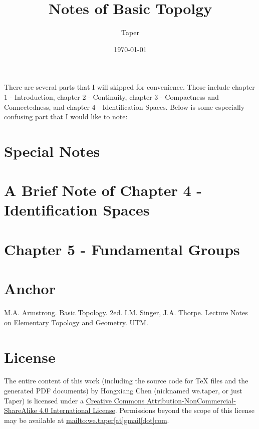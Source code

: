 \documentclass{article}
\title{Notes of Basic Topolgy}
\date{\today}
\author{Taper}
\begin{document}
\maketitle
{}
\tableofcontents
There are several parts that I will skipped for convenience. Those
include chapter 1 - Introduction, chapter 2 - Continuity, chapter 3 -
Compactness and Connectedness, and chapter 4 - Identification Spaces.
Below is some especially confusing part that I would like to note:

\section{Special Notes}
\label{sec:Special-Notes}


\section{A Brief Note of Chapter 4 - Identification Spaces}
\label{sec:Brief-Note-Chapter-4}


\section{Chapter 5 - Fundamental Groups}
\label{sec:Chapter-5-Fundamental-Groups}


\section{Anchor}
\label{sec:Anchor}

\begin{thebibliography}{1}
     M.A. Armstrong. Basic Topology. 2ed.
     I.M. Singer, J.A. Thorpe. Lecture Notes on
    Elementary Topology and Geometry. UTM.
\end{thebibliography}
\printnomenclature
\section{License}
The entire content of this work (including the source code
for TeX files and the generated PDF documents) by 
Hongxiang Chen (nicknamed we.taper, or just Taper) is
licensed under a 
\href{http://creativecommons.org/licenses/by-nc-sa/4.0/}{Creative 
Commons Attribution-NonCommercial-ShareAlike 4.0 International 
License}. Permissions beyond the scope of this 
license may be available at \url{mailto:we.taper[at]gmail[dot]com}.
\end{document}
